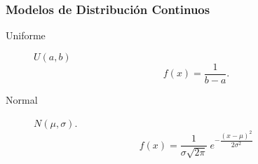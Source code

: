 \documentclass[a4paper,dvips]{article}
\newlength{\mylength}
\newenvironment{marco}{
	\setlength{\fboxsep}{5pt}
	\setlength{\mylength}{\textwidth}
	\addtolength{\mylength}{-2\fboxsep}
	\addtolength{\mylength}{-2\fboxrule}
	\noindent
	\begin{Sbox}
	\begin{minipage}{\mylength}
	\setlength{\abovedisplayskip}{3pt}
	\setlength{\belowdisplayskip}{3pt}
}
{
	\end{minipage}
	\end{Sbox}
	\fbox{\TheSbox}
}
\begin{document}
\begin{marco}
\begin{multicols}{2}
\subsubsection*{Modelos de Distribución Continuos}
\begin{description}
\item [Uniforme] $U(a,b)$
\[f(x)=\frac{1}{b-a}.\]
\item [Normal] $N(\mu,\sigma)$.
\[
f(x)=\dfrac{1}{\sigma \sqrt{2\pi }}\ e^{-\dfrac{(x-\mu )^{2}}{2\sigma ^{2}}}
\]
\end{description}
\end{multicols}
\end{marco}
\end{document}
